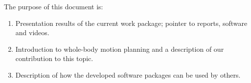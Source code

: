 The purpose of this document is:
\begin{enumerate}
    \item Presentation results of the current work package; pointer to reports, software and videos.
    \item Introduction to whole-body motion planning and a description of our contribution to this topic.
    \item Description of how the developed software packages can be used by others.
\end{enumerate}

